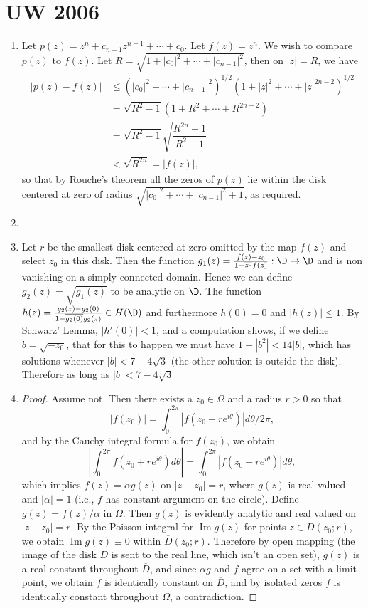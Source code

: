 \documentclass[11pt]{book}
\theoremstyle{definition}
\renewcommand{\Im}{\operatorname{Im}}
\begin{document}
\section{UW 2006}
\begin{enumerate}
\item Let $p(z)=z^n+c_{n-1}z^{n-1}+\cdots+c_0$. Let $f(z)=z^n$. We wish to compare $p(z)$ to $f(z)$. Let $R=\sqrt{1+|c_0|^2+\cdots+|c_{n-1}|^2}$, then on $|z|=R$, we have
\begin{align*}
|p(z)-f(z)|&\leq (|c_0|^2+\cdots+|c_{n-1}|^2)^{1/2}(1+|z|^2+\cdots+|z|^{2n-2})^{1/2} \\
&= \sqrt{R^2-1}(1+R^2+\cdots+R^{2n-2})\\
&= \sqrt{R^2-1}\sqrt{\dfrac{R^{2n}-1}{R^2-1}} \\
&< \sqrt{R^{2n}}=|f(z)|,
\end{align*}
so that by Rouche's theorem all the zeros of $p(z)$ lie within the disk centered at zero of radius $\sqrt{|c_0|^2+\cdots+|c_{n-1}|^2+1}$, as required.
\item 
\item Let $r$ be the smallest disk centered at zero omitted by the map $f(z)$ and select $z_0$ in this disk. Then the function $g_1(z)=\frac{f(z)-z_0}{1-\overline{z_0}f(z)}:\D\to\D$ and is non vanishing on a simply connected domain. Hence we can define $g_2(z)=\sqrt{g_1(z)}$ to be analytic on $\D$. The function $h(z)=\frac{g_2(z)-g_2(0)}{1-\overline{g_2(0)}g_2(z)}\in H(\D)$ and furthermore $h(0)=0$ and $|h(z)|\leq 1$. By Schwarz' Lemma, $|h'(0)|<1$, and a computation shows, if we define $b=\sqrt{-z_0}$, that for this to happen we must have $1+|b^2|<14|b|$, which has solutions whenever $|b|<7-4\sqrt{3}$ (the other solution is outside the disk). Therefore as long as $|b|<7-4\sqrt{3}$ 
\item
\begin{proof}
Assume not. Then there exists a $z_0\in\Omega$ and a radius $r>0$ so that \[
|f(z_0)|=\int_0^{2\pi} |f(z_0+re^{i\theta})|d\theta/2\pi,\]
and by the Cauchy integral formula for $f(z_0)$, we obtain
\[
|\int_0^{2\pi}f(z_0+re^{i\theta})d\theta| =\int_0^{2\pi} |f(z_0+re^{i\theta})|d\theta,
\]
which implies $f(z)=\alpha g(z)$ on $|z-z_0|=r$, where $g(z)$ is real valued and $|\alpha|=1$ (i.e., $f$ has constant argument on the circle). Define $g(z)=f(z)/\alpha$ in $\Omega$. Then $g(z)$ is evidently analytic and real valued on $|z-z_0|=r$. By the Poisson integral for $\Im g(z)$ for points $z\in D(z_0;r)$, we obtain $\Im g(z)\equiv 0$ within $\overline{D}(z_0;r)$. Therefore by open mapping (the image of the disk $D$ is sent to the real line, which isn't an open set), $g(z)$ is a real constant throughout $\overline{D}$, and since $\alpha g$ and $f$ agree on a set with a limit point, we obtain $f$ is identically constant on $\overline{D}$, and by isolated zeros $f$ is identically constant throughout $\Omega$, a contradiction.

\end{proof}
\end{enumerate}
\end{document}
